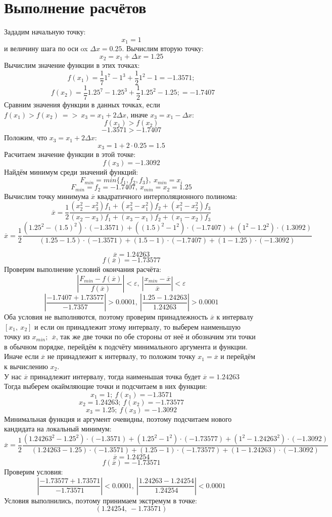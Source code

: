 \documentclass{article}
\begin{document}
\section{Выполнение расчётов}
Зададим начальную точку: \[x_1 =1\] и величину шага по оси ox $\Delta x = 0.25$. 
Вычислим вторую точку: \[x_2 = x_1+\Delta x = 1.25\]
Вычислим значение функции в этих точках: \[f(x_1) = \frac{1}{7}1^7 - 1^3+\frac{1}{2}1^2-1 = -1.3571;\]
\[ \ \ f(x_2) = \frac{1}{7}1.25^7 - 1.25^3+\frac{1}{2}1.25^2-1.25; = -1.7407\]
Сравним значения функции в данных точках, если $f(x_1) > f(x_2) \ =>\ x_3 = x_1 +2\Delta x$, иначе $x_3 = x_1-\Delta x$: 
\[f(x_1) > f(x_2)\]
\[-1.3571 > -1.7407\]
Положим, что $x_3 = x_1 +2\Delta x$:
\[x_3 = 1 + 2\cdot 0.25 = 1.5\]
Расчитаем значение функции в этой точке:
\[f(x_3) = -1.3092\]
Найдём минимум среди значений функций:
\[F_{min} = min\{f_1,f_2,f_3\},\ x_{min} = x_i\]
\[F_{min} = f_2 = -1.7407,\ x_{min} = x_2 = 1.25\]
Вычислим точку минимума $\overline{x}$ квадратичного интерполяционного полинома:
\[\overline{x} = \frac{1}{2} \frac{(x_2^2-x_3^2)f_1 + (x_3^2-x_1^2)f_2+(x_1^2-x_2^2)f_3}{(x_2-x_3)f_1+(x_3-x_1)f_2+(x_1-x_2)f_3}\]
\[\overline{x} = \frac{1}{2} \frac{(1.25^2-(1.5)^2)\cdot(-1.3571) + ((1.5)^2-1^2)\cdot(-1.7407)+(1^2-1.2^2)\cdot(1.3092)}{(1.25-1.5)\cdot(-1.3571)+(1.5-1)\cdot(-1.7407)+(1-1.25)\cdot(-1.3092)}\]


\[\overline{x} = 1.24263\]
\[f(\overline{x}) = -1.73577\]
Проверим выполнение условий окончания расчёта:
\[\left|\frac{F_{min}-f(\overline{x})}{f(\overline{x})}\right|<\varepsilon,\ \left|\frac{x_{min}-\overline{x}}{\overline{x}}\right|<\varepsilon\]
\[\left|\frac{-1.7407+1.73577}{-1.7357}\right|>0.0001,\ \left|\frac{1.25-1.24263}{1.24263}\right|>0.0001\]
Оба условия не выполняются, поэтому проверим принадлежность $\overline{x}$ к интервалу $[x_1,\ x_2]$ и если он принадлежит этому интервалу, то выберем наименьшую точку из $x_{min};\ \ \overline{x}$, так же две точки по обе стороны от неё и обозначим эти точки в обычном порядке, перейдём к подсчёту минимального аргумента и функции. Иначе если $\overline{x}$  не принадлежит к интервалу, то положим точку $x_1 = \overline{x}$ и перейдём к вычислению $x_2$.
\\
У нас $\overline{x}$ принадлежит интервалу, тогда наименьшая точка будет $\overline{x} = 1.24263$
\\
Тогда выберем окаймляющие точки и подсчитаем в них функции:
\[x_1 = 1;\ f(x_1) = -1.3571\]
\[x_2 = 1.24263;\ f(x_2) = -1.73577\]
\[x_3 = 1.25;\ f(x_3) = -1.3092\]
Минимальная функция и  аргумент очевидны, поэтому подсчитаем нового кандидата на локальный минимум:
\[\overline{x} = \frac{1}{2} \frac{(1.24263^2-1.25^2)\cdot(-1.3571) + (1.25^2-1^2)\cdot(-1.73577)+(1^2-1.24263^2)\cdot(-1.3092)}{(1.24263-1.25)\cdot (-1.3571)+(1.25-1)\cdot(-1.73577)+(1-1.24263)\cdot(-1.3092)}\]
\[\overline{x} = 1.24254\]
\[f(\overline{x}) = -1.73571\]
Проверим условия:
\[\left|\frac{-1.73577+1.73571}{-1.73571}\right|<0.0001,\ \left|\frac{1.24263-1.24254}{1.24254}\right|<0.0001\]
Условия выполнились, поэтому принимаем экстремум в точке:
\[(1.24254,\ -1.73571)\]
\end{document}

